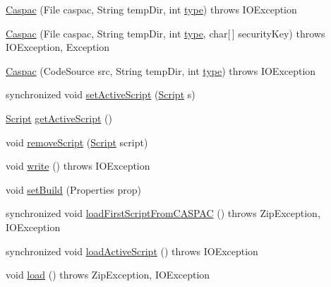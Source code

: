 \begin{DoxyCompactItemize}
\item 
\hyperlink{class_c_a_s_u_a_l_1_1caspac_1_1_caspac_ab38e5cbb99b6d16f213340e9e61e74be}{Caspac} (File caspac, String temp\-Dir, int \hyperlink{class_c_a_s_u_a_l_1_1caspac_1_1_caspac_a1fa7fccdf284c0b71c45004978d8c7d4}{type})  throws I\-O\-Exception 
\item 
\hyperlink{class_c_a_s_u_a_l_1_1caspac_1_1_caspac_a5e48084a2dab585c35cbbfaa4fa9d930}{Caspac} (File caspac, String temp\-Dir, int \hyperlink{class_c_a_s_u_a_l_1_1caspac_1_1_caspac_a1fa7fccdf284c0b71c45004978d8c7d4}{type}, char\mbox{[}$\,$\mbox{]} security\-Key)  throws I\-O\-Exception, Exception 
\item 
\hyperlink{class_c_a_s_u_a_l_1_1caspac_1_1_caspac_add729e52bae97e76abb6274c966d0cef}{Caspac} (Code\-Source src, String temp\-Dir, int \hyperlink{class_c_a_s_u_a_l_1_1caspac_1_1_caspac_a1fa7fccdf284c0b71c45004978d8c7d4}{type})  throws I\-O\-Exception 
\item 
synchronized void \hyperlink{class_c_a_s_u_a_l_1_1caspac_1_1_caspac_ad9977d679506d5819d18281b4e2c6c19}{set\-Active\-Script} (\hyperlink{class_c_a_s_u_a_l_1_1caspac_1_1_script}{Script} s)
\item 
\hyperlink{class_c_a_s_u_a_l_1_1caspac_1_1_script}{Script} \hyperlink{class_c_a_s_u_a_l_1_1caspac_1_1_caspac_acb6c1d1e3d6d4e69930a0eeba2be3326}{get\-Active\-Script} ()
\item 
void \hyperlink{class_c_a_s_u_a_l_1_1caspac_1_1_caspac_a6368289098354e4d854ed665eb956dbe}{remove\-Script} (\hyperlink{class_c_a_s_u_a_l_1_1caspac_1_1_script}{Script} script)
\item 
void \hyperlink{class_c_a_s_u_a_l_1_1caspac_1_1_caspac_a872aa569a507a588786ad590b1a66d3b}{write} ()  throws I\-O\-Exception 
\item 
void \hyperlink{class_c_a_s_u_a_l_1_1caspac_1_1_caspac_a9bbcc820fc5af56dd7e2a45908db30e6}{set\-Build} (Properties prop)
\item 
synchronized void \hyperlink{class_c_a_s_u_a_l_1_1caspac_1_1_caspac_a22fd32e7eb1a0a589eb0ed54c64f1a4b}{load\-First\-Script\-From\-C\-A\-S\-P\-A\-C} ()  throws Zip\-Exception, I\-O\-Exception 
\item 
synchronized void \hyperlink{class_c_a_s_u_a_l_1_1caspac_1_1_caspac_a5aab5060f3557b221f898fbc775690aa}{load\-Active\-Script} ()  throws I\-O\-Exception 
\item 
void \hyperlink{class_c_a_s_u_a_l_1_1caspac_1_1_caspac_a8dde0efbfc89cc5eba2a76bc29b2cd93}{load} ()  throws Zip\-Exception, I\-O\-Exception 

\end{DoxyCompactItemize}
